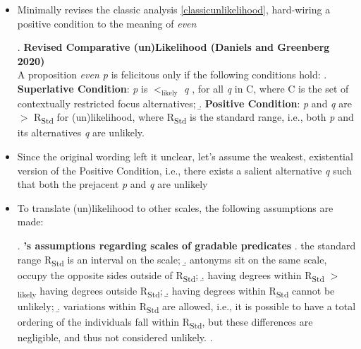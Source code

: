 \documentclass[11pt,letterpaper]{scrartcl}
\newcommand{\sub}[1]{\textsubscript{#1}}
\begin{document}
\begin{itemize}
    \item Minimally revises the classic analysis \ref{classicunlikelihood}, hard-wiring a positive condition to the meaning of \textit{even}
    
    \ex.\label{DG_Unlikelihood} \textbf{Revised Comparative (un)Likelihood (Daniels and Greenberg 2020)} \\
    A proposition \textit{even p} is felicitous only if the following conditions hold:
    \a. \textbf{Superlative Condition}: \textit{p} is $<_{\text{likely}}$ \textit{q }, for all \textit{q} in C, where C is the set of contextually restricted focus alternatives;
    \b. \textbf{Positive Condition}: \textit{p} and \textit{q } are $>$ R\textsubscript{Std} for (un)likelihood, where R\textsubscript{Std} is the standard range, i.e., both \textit{p} and its alternatives \textit{q} are unlikely.
    
    \item Since the original wording left it unclear, let's assume the weakest, existential version of the Positive Condition, i.e., there exists a salient alternative \textit{q} such that both the prejacent \textit{p} and \textit{q} are unlikely
    
    \item To translate (un)likelihood to other scales, the following assumptions are made:

    \ex.\label{DG_assumptions} \textbf{\cite{daniels_even_2020}'s assumptions regarding scales of gradable predicates}
    \a. the standard range R\sub{Std} is an interval on the scale;
    \b. antonyms sit on the same scale, occupy the opposite sides outside of R\sub{Std};
    \b. having degrees within R\sub{Std} $>$\sub{likely} having degrees outside R\sub{Std};
    \b. having degrees within R\sub{Std} cannot be unlikely;
    \b.\label{averagevariations} variations within R\sub{Std} are allowed, i.e., it is possible to have a total ordering of the individuals fall within R\sub{Std}, but these differences are negligible, and thus not considered unlikely. 
    \z.


\end{itemize}
\end{document}
